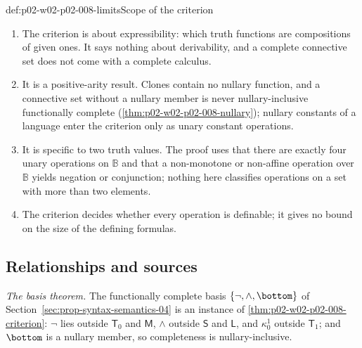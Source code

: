 \begin{hbwarning}{def:p02-w02-p02-008-limits}{Scope of the criterion}
\begin{enumerate}
\item The criterion is about expressibility: which truth functions are
  compositions of given ones.  It says nothing about derivability, and a
  complete connective set does not come with a complete calculus.
\item It is a positive-arity result.  Clones contain no nullary function,
  and a connective set without a nullary member is never nullary-inclusive
  functionally complete (\cref{thm:p02-w02-p02-008-nullary}); nullary
  constants of a language enter the criterion only as unary constant
  operations.
\item It is specific to two truth values.  The proof uses that there are
  exactly four unary operations on \(\mathbb B\) and that a
  non-monotone or non-affine operation over \(\mathbb B\) yields negation or
  conjunction; nothing here classifies operations on a set with more than
  two elements.
\item The criterion decides whether every operation is definable; it gives
  no bound on the size of the defining formulas.
\end{enumerate}
\end{hbwarning}

\subsection{Relationships and sources}
\label{sec:p02-w02-p02-008-relationships}

\emph{The basis theorem.}  The functionally complete basis
\(\{\neg,\land,\bottom\}\) of Section~\ref{sec:prop-syntax-semantics-04} is an
instance of \cref{thm:p02-w02-p02-008-criterion}: \(\neg\) lies outside
\(\mathsf T_0\) and \(\mathsf M\), \(\land\) outside \(\mathsf S\) and
\(\mathsf L\), and \(\kappa^1_0\) outside \(\mathsf T_1\); and \(\bottom\) is
a nullary member, so completeness is nullary-inclusive.


